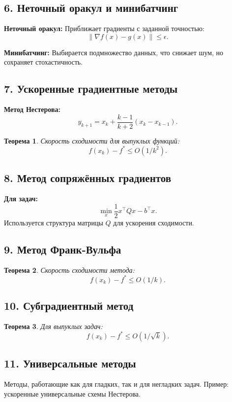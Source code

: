 \documentclass[a4paper,12pt]{article}
\newtheorem{theorem}{Теорема}
\begin{document}
\subsection*{6. Неточный оракул и минибатчинг}
\textbf{Неточный оракул:} Приближает градиенты с заданной точностью:
\[
\|\nabla f(x) - g(x)\| \leq \epsilon.
\]

\textbf{Минибатчинг:} Выбирается подмножество данных, что снижает шум, но сохраняет стохастичность.

\subsection*{7. Ускоренные градиентные методы}
\textbf{Метод Нестерова:}
\[
y_{k+1} = x_k + \frac{k-1}{k+2}(x_k - x_{k-1}).
\]

\begin{theorem}
Скорость сходимости для выпуклых функций:
\[
f(x_k) - f^* \leq O(1/k^2).
\]
\end{theorem}

\subsection*{8. Метод сопряжённых градиентов}
\textbf{Для задач:}
\[
\min_x \frac{1}{2}x^\top Qx - b^\top x.
\]
Используется структура матрицы \(Q\) для ускорения сходимости.

\subsection*{9. Метод Франк-Вульфа}
\begin{theorem}
Скорость сходимости метода:
\[
f(x_k) - f^* \leq O(1/k).
\]
\end{theorem}

\subsection*{10. Субградиентный метод}
\begin{theorem}
Для выпуклых задач:
\[
f(x_k) - f^* \leq O(1/\sqrt{k}).
\]
\end{theorem}

\subsection*{11. Универсальные методы}
Методы, работающие как для гладких, так и для негладких задач. Пример: ускоренные универсальные схемы Нестерова.
\end{document}
